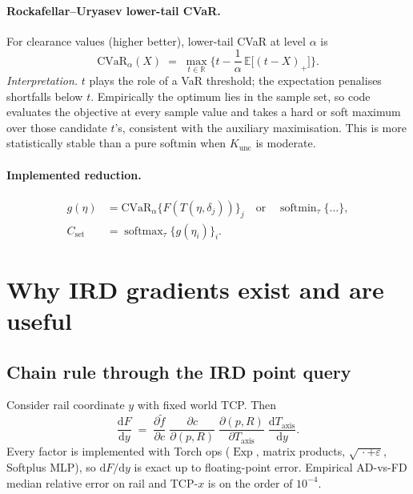 \documentclass[11pt,a4paper]{article}
\newcommand{\R}{\mathbb{R}}
\newcommand{\Taxis}{T_{\mathrm{axis}}}
\newcommand{\softmin}{\operatorname{softmin}}
\newcommand{\softmax}{\operatorname{softmax}}
\newcommand{\CVaR}{\mathrm{CVaR}}
\begin{document}
\paragraph{Rockafellar--Uryasev lower-tail CVaR.}
For clearance values (higher better), lower-tail CVaR at level \(\alpha\) is
\begin{equation}
\label{eq:cvar}
  \CVaR_{\alpha}(X)
  \;=\;
  \max_{t\in\R}
  \Biggl\{
    t
    -
    \frac{1}{\alpha}\,
    \mathbb{E}\bigl[(t-X)_{+}\bigr]
  \Biggr\}.
\end{equation}
\emph{Interpretation.}
\(t\) plays the role of a VaR threshold; the expectation penalises shortfalls
below \(t\). Empirically the optimum lies in the sample set, so code evaluates
the objective at every sample value and takes a hard or soft maximum over those
candidate \(t\)'s, consistent with the auxiliary maximisation. This is more
statistically stable than a pure softmin when
\(K_{\mathrm{unc}}\) is moderate.

\paragraph{Implemented reduction.}
\begin{equation}
\label{eq:set-query}
\begin{aligned}
  g(\eta)
  &=
  \CVaR_{\alpha}\bigl\{F(T(\eta,\delta_{j}))\bigr\}_{j}
  \quad\text{or}\quad
  \softmin_{\tau}\{\ldots\},
  \\
  C_{\mathrm{set}}
  &=
  \softmax_{\tau}\bigl\{g(\eta_{i})\bigr\}_{i}.
\end{aligned}
\end{equation}

\section{Why IRD gradients exist and are useful}
\label{sec:gradients}

\subsection{Chain rule through the IRD point query}
\label{sec:chain}

Consider rail coordinate \(y\) with fixed world TCP. Then
\begin{equation}
\label{eq:chain-rail}
  \frac{\mathrm{d}F}{\mathrm{d}y}
  \;=\;
  \frac{\partial\tilde f}{\partial c}\;
  \frac{\partial c}{\partial (p,R)}\;
  \frac{\partial (p,R)}{\partial \Taxis}\;
  \frac{\mathrm{d}\Taxis}{\mathrm{d}y}.
\end{equation}
Every factor is implemented with Torch ops (\(\operatorname{Exp}\), matrix
products, \(\sqrt{\,\cdot+\varepsilon}\), Softplus MLP), so
\(\mathrm{d}F/\mathrm{d}y\) is exact up to floating-point error. Empirical
AD-vs-FD median relative error on rail and TCP-\(x\) is on the order of
\(10^{-4}\).
\end{document}

